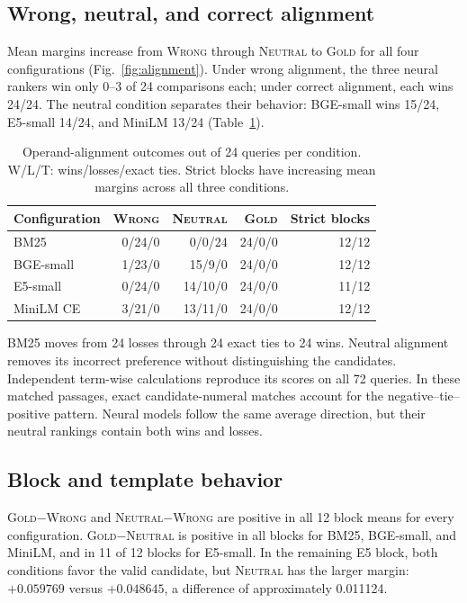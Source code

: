 \documentclass[conference,letterpaper]{IEEEtran}
\newcommand{\wrong}{\textsc{Wrong}}
\newcommand{\neutral}{\textsc{Neutral}}
\newcommand{\gold}{\textsc{Gold}}
\begin{document}
\subsection{Wrong, neutral, and correct alignment}
Mean margins increase from \wrong{} through \neutral{} to \gold{} for all four configurations (Fig.~\ref{fig:alignment}). Under wrong alignment, the three neural rankers win only 0--3 of 24 comparisons each; under correct alignment, each wins 24/24. The neutral condition separates their behavior: BGE-small wins 15/24, E5-small 14/24, and MiniLM 13/24 (Table~\ref{tab:alignment}).
\begin{table}[t]
\caption{Operand-alignment outcomes out of 24 queries per condition. W/L/T: wins/losses/exact ties. Strict blocks have increasing mean margins across all three conditions.}
\label{tab:alignment}
\centering\footnotesize
\begin{tabular}{lrrrr}
\toprule
Configuration & \wrong & \neutral & \gold & Strict blocks \\
\midrule
BM25 & 0/24/0 & 0/0/24 & 24/0/0 & 12/12 \\
BGE-small & 1/23/0 & 15/9/0 & 24/0/0 & 12/12 \\
E5-small & 0/24/0 & 14/10/0 & 24/0/0 & 11/12 \\
MiniLM CE & 3/21/0 & 13/11/0 & 24/0/0 & 12/12 \\
\bottomrule
\end{tabular}
\end{table}
BM25 moves from 24 losses through 24 exact ties to 24 wins. Neutral alignment removes its incorrect preference without distinguishing the candidates. Independent term-wise calculations reproduce its scores on all 72 queries. In these matched passages, exact candidate-numeral matches account for the negative--tie--positive pattern. Neural models follow the same average direction, but their neutral rankings contain both wins and losses.

\subsection{Block and template behavior}
\gold$-$\wrong{} and \neutral$-$\wrong{} are positive in all 12 block means for every configuration. \gold$-$\neutral{} is positive in all blocks for BM25, BGE-small, and MiniLM, and in 11 of 12 blocks for E5-small. In the remaining E5 block, both conditions favor the valid candidate, but \neutral{} has the larger margin: $+0.059769$ versus $+0.048645$, a difference of approximately 0.011124.
\end{document}
